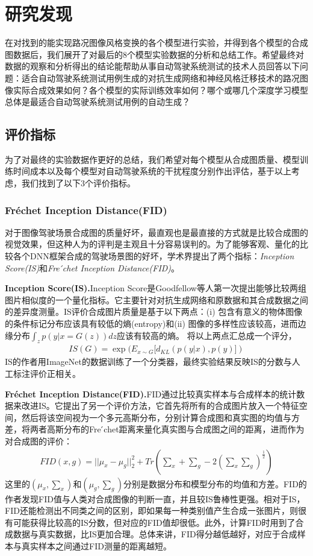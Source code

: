 \chapter{研究发现}

在对找到的能实现路况图像风格变换的各个模型进行实验，并得到各个模型的合成图数据后，我们展开了对最后的8个模型实验数据的分析和总结工作。希望最终对数据的观察和分析得出的结论能帮助从事自动驾驶系统测试的技术人员回答以下问题：适合自动驾驶系统测试用例生成的对抗生成网络和神经风格迁移技术的路况图像实际合成效果如何？各个模型的实际训练效率如何？哪个或哪几个深度学习模型总体是最适合自动驾驶系统测试用例的自动生成？

\section{评价指标}

为了对最终的实验数据作更好的总结，我们希望对每个模型从合成图质量、模型训练时间成本以及每个模型对自动驾驶系统的干扰程度分别作出评估，基于以上考虑，我们找到了以下3个评价指标。

\subsection{Fr\'{e}chet Inception Distance(FID)}

对于图像驾驶场景合成图的质量好坏，最直观也是最直接的方式就是比较合成图的视觉效果，但这种人为的评判是主观且十分容易误判的。为了能够客观、量化的比较各个DNN框架合成的驾驶场景图的好坏，学术界提出了两个指标：\textit{Inception Score(IS)}\cite{IS}和\textit{Fre ́chet Inception Distance(FID)}\cite{FID}。

\textbf{Inception Score(IS).\cite{IS}}\quad Inception Score是Goodfellow等人第一次提出能够比较两组图片相似度的一个量化指标。它主要针对对抗生成网络和原数据和其合成数据之间的差异度测量。IS评价合成图片质量是基于以下两点：(i) 包含有意义的物体图像的条件标记分布应该具有较低的熵(entropy)和(ii) 图像的多样性应该较高，进而边缘分布$\int_z p(y|x=G(z))dz$应该有较高的熵。
将以上两点汇总成一个评分，
\begin{gather}
    IS(G)=\exp{(E_{x\sim G}[d_{KL}(p(y|x), p(y)])}
\end{gather}
IS的作者用ImageNet\cite{ImageNet}的数据训练了一个分类器，最终实验结果反映IS的分数与人工标注评价正相关。

\textbf{Fr\'{e}chet Inception Distance(FID).\cite{FID}}\quad FID通过比较真实样本与合成样本的统计数据来改进IS。它提出了另一个评价方法，它首先将所有的合成图片放入一个特征空间，然后将该空间视为一个多元高斯分布，分别计算合成图和真实图的均值与方差，将两者高斯分布的Fre ́chet距离来量化真实图与合成图之间的距离，进而作为对合成图的评价：
\begin{gather}
    FID(x,g)=||\mu_x-\mu_g||_2^2+Tr(\sum_x + \sum_g - 2(\sum_x\sum_g)^{\frac{1}{2}})
\end{gather}
这里的$(\mu_x,\sum_x)$和$(\mu_g,\sum_g)$分别是数据分布和模型分布的均值和方差。FID的作者发现FID值与人类对合成图像的判断一直，并且较IS\cite{IS}鲁棒性更强。相对于IS，FID还能检测出不同类之间的区别，即如果每一种类别值产生合成一张图片，则很有可能获得比较高的IS分数，但对应的FID值却很低。此外，计算FID时用到了合成数据与真实数据，比IS更加合理。总体来讲，FID得分越低越好，对应于合成样本与真实样本之间通过FID测量的距离越短。


